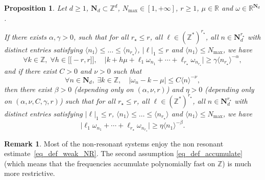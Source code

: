 \documentclass[11pt]{article}
\newcommand{\llbracket}{\mathopen{[\!\![}}
\newcommand{\rrbracket}{\mathclose{]\!\!]}}
\newtheorem{proposition}[theorem]{Proposition}
\theoremstyle{definition}
\newtheorem{remark}[theorem]{Remark}
\begin{document}
\begin{proposition} \label{prop_weak_become_strong} Let $d\geq 1$, $\mathbf{N}_d \subset \mathbb{Z}^d$, $N_{\max} \in [1,+\infty]$, $r\geq 1$, $\mu \in \mathbb{R}$ and $\omega \in \mathbb{R}^{\mathbf{N}_d}$.

If there exists $\alpha,\gamma>0$, such that for all $r_\star \leq r$, all $\ell \in (\mathbb{Z}^*)^{r_\star}$, all $n \in \mathbf{N}_d^{r_\star}$ with distinct entries satisfying $\langle n_1 \rangle \leq \dots \leq \langle n_{r_\star} \rangle$, $|\ell|_1 \leq r$ and $\langle n_1 \rangle \leq N_{\max}$, we have
\begin{equation}
\label{eq_def_weak_NR}
\forall k \in \mathbb{Z},\;\forall h\in \llbracket -r,r \rrbracket, \quad
\big| k + h\mu+\ell_1 \omega_{n_1}+\cdots +\ell_{r_\star} \omega_{n_{r_\star}} \big| \geq \gamma \langle n_{r_\star} \rangle^{-\alpha},
\end{equation}
and if there exist $C>0$ and $\nu >0$ such that
\begin{equation}
\label{eq_def_accumulate}
\forall n \in \mathbf{N}_d,\; \exists k \in \mathbb{Z}, \quad |\omega_n - k - \mu | \leq C \langle n \rangle^{-\nu},
\end{equation}
then there exist $\beta>0$ (depending only on $(\alpha,\nu,r)$) and $\eta >0$ (depending only on $(\alpha,\nu,C,\gamma,r)$) such that for all $r_\star \leq r$, all $\ell \in (\mathbb{Z}^*)^{r_\star}$, all $n \in \mathbf{N}_d^{r_\star}$ with distinct entries satisfying $|\ell|_1 \leq r$, $\langle n_1 \rangle \leq \dots \leq \langle n_{r_\star} \rangle$ and $\langle n_1 \rangle \leq N_{\max}$, we have
\begin{equation}
\label{eq_def_strong_NR}
\big| \ell_1 \omega_{n_1}+\cdots +\ell_{r_\star} \omega_{n_{r_\star}} \big| \geq \eta \langle n_{1} \rangle^{-\beta}.
\end{equation}
\end{proposition}
\begin{remark} Most of the non-resonant systems enjoy the non resonant estimate~\eqref{eq_def_weak_NR}. The second assumption \eqref{eq_def_accumulate} (which means that the frequencies accumulate polynomially fast on $ \mathbb{Z}$) is much more restrictive.
\end{remark}
\end{document}
